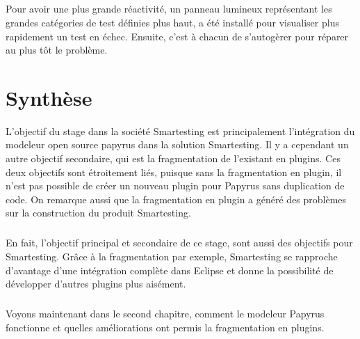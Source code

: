 \subparagraph*{}
Pour avoir une plus grande réactivité, un panneau lumineux représentant les grandes catégories de test définies plus haut, a été installé pour visualiser plus rapidement un test en échec.
Ensuite, c'est à chacun de s'autogèrer pour réparer au plus tôt le problème.

\section{Synthèse}

L'objectif du stage dans la société Smartesting est principalement l'intégration du modeleur open source papyrus dans la solution Smartesting.
Il y a cependant un autre objectif secondaire, qui est la fragmentation de l'existant en plugins.
Ces deux objectifs sont étroitement liés, puisque sans la fragmentation en plugin, il n'est pas possible de créer un nouveau plugin pour Papyrus sans duplication de code.
On remarque aussi que la fragmentation en plugin a généré des problèmes sur la construction du produit Smartesting.

\subparagraph*{}
En fait, l'objectif principal et secondaire de ce stage, sont aussi des objectifs pour Smartesting.
Grâce à la fragmentation par exemple, Smartesting se rapproche d'avantage d'une intégration complète dans Eclipse et donne la possibilité de développer d'autres plugins plus aisément.

\subparagraph*{}
Voyons maintenant dans le second chapitre, comment le modeleur Papyrus fonctionne et quelles améliorations ont permis la fragmentation en plugins.
